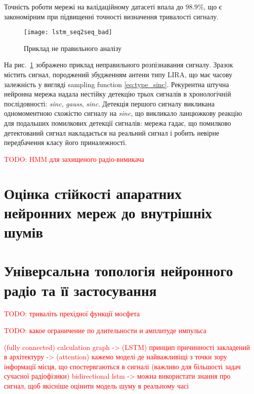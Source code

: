 Точність роботи мережі на валідаційному датасеті впала до $ 98.9\% $,
що є закономірним при підвищенні точності визначення тривалості сигналу.

\begin{figure}[htbp] \begin{center}
\texttt{[image: lstm\_seq2seq\_bad]}
\caption{Приклад не правильного аналізу} \label{fig:lstm_seq2seq_bad}
\end{center} \end{figure}

На рис.~\ref{fig:lstm_seq2seq_bad} зображено приклад неправильного
розпізнавання сигналу. Зразок містить сигнал, породжений збудженням антени 
типу LIRA, що має часову залежність у вигляді sampling function 
\eqref{eq:type_sinc}. Рекурентна штучна нейронна мережа надала нестійку
детекцію трьох сигналів в хронологічній послідовності: \textit{sinc}, 
\textit{gauss}, \textit{sinc}. Детекція першого сигналу викликана 
одномоментною схожістю сигналу на \textit{sinc}, що викликало ланцюжкову 
реакцію для подальших помилкових детекції сигналів: мережа гадає, що 
помилково детектований сигнал накладається на реальний сигнал і робить 
невірне передбачення класу його приналежності.

\textcolor{red}{TODO: HMM для захищеного радіо-вимикача }

\section{Оцінка стійкості апаратних нейронних мереж до внутрішніх шумів}

\section{Універсальна топологія нейронного радіо та її застосування}

\textcolor{red}{TODO: триваліть прехідної функції мосфета }

\textcolor{red}{TODO: какое ограничение по длительности и амплитуде импульса}

\textcolor{red}{ (fully connected) calculation graph -> (LSTM) принцип 
причинності закладений в архітектуру -> (attention) кажемо моделі де 
найважливіщі з точки зору інформації місця, що спостервгаються в сигналі 
(важливо для більшості задач сучасної радіофізики) bidirectional lstm -> 
можна використати знання про сигнал, щоб якісніше оцінити модель шуму в 
реальному часі}

